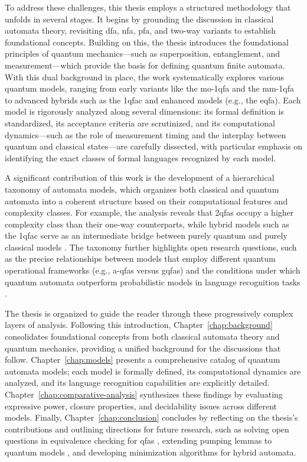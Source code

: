 To address these challenges, this thesis employs a structured methodology that unfolds in several stages. It begins by grounding the discussion in classical automata theory, revisiting \gls{dfa}, \gls{nfa}, \gls{pfa}, and two-way variants to establish foundational concepts. Building on this, the thesis introduces the foundational principles of quantum mechanics---such as superposition, entanglement, and measurement---which provide the basis for defining quantum finite automata. With this dual background in place, the work systematically explores various quantum models, ranging from early variants like the \gls{mo-1qfa} \cite{moore2000quantum} and the \gls{mm-1qfa} \cite{kondacs1997power} to advanced hybrids such as the \gls{1qfac} and enhanced models (e.g., the \gls{eqfa}). Each model is rigorously analyzed along several dimensions: its formal definition is standardized, its acceptance criteria are scrutinized, and its computational dynamics—such as the role of measurement timing and the interplay between quantum and classical states---are carefully dissected, with particular emphasis on identifying the exact classes of formal languages recognized by each model.

A significant contribution of this work is the development of a hierarchical taxonomy of automata models, which organizes both classical and quantum automata into a coherent structure based on their computational features and complexity classes. For example, the analysis reveals that \glspl{2qfa} occupy a higher complexity class than their one-way counterparts, while hybrid models such as the \gls{1qfac} serve as an intermediate bridge between purely quantum and purely classical models \cite{yakaryilmaz2010succinctness}. The taxonomy further highlights open research questions, such as the precise relationships between models that employ different quantum operational frameworks (e.g., \glspl{a-qfa} versus \glspl{gqfa}) and the conditions under which quantum automata outperform probabilistic models in language recognition tasks \cite{hirvensalo2012quantum}.

The thesis is organized to guide the reader through these progressively complex layers of analysis. Following this introduction, Chapter~\ref{chap:background} consolidates foundational concepts from both classical automata theory and quantum mechanics, providing a unified background for the discussions that follow. Chapter~\ref{chap:models} presents a comprehensive catalog of quantum automata models; each model is formally defined, its computational dynamics are analyzed, and its language recognition capabilities are explicitly detailed. Chapter~\ref{chap:comparative-analysis} synthesizes these findings by evaluating expressive power, closure properties, and decidability issues across different models. Finally, Chapter~\ref{chap:conclusion} concludes by reflecting on the thesis’s contributions and outlining directions for future research, such as solving open questions in equivalence checking for \glspl{qfa} \cite{li2012characterizations}, extending pumping lemmas to quantum models \cite{ambainis1998one}, and developing minimization algorithms for hybrid automata.


